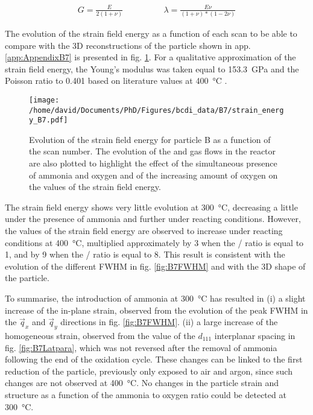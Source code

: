 \begin{align}
    G = \frac{E}{2(1+\nu)} \qquad & \qquad \lambda = \frac{E \nu}{(1+\nu)*(1-2\nu)}
    \label{eq:GandNu}
\end{align}

The evolution of the strain field energy as a function of each scan to be able to compare with the 3D reconstructions of the particle shown in app. \ref{app:AppendixB7} is presented in fig. \ref{fig:B7SFE}.
For a qualitative approximation of the strain field energy, the Young's modulus was taken equal to \qty{153.3}{\giga\pascal} and the Poisson ratio to \num{0.401} based on literature values at \qty{400}{\degreeCelsius} \parencite{Matthey2022}.

\begin{figure}[!htb]
    \centering
    \texttt{[image: /home/david/Documents/PhD/Figures/bcdi\_data/B7/strain\_energy\_B7.pdf]}
    \caption{
        Evolution of the strain field energy for particle B as a function of the scan number.
        The evolution of the  and  gas flows in the reactor are also plotted to highlight the effect of the simultaneous presence of ammonia and oxygen and of the increasing amount of oxygen on the values of the strain field energy.
    }
    \label{fig:B7SFE}
\end{figure}

The strain field energy shows very little evolution at \qty{300}{\degreeCelsius}, decreasing a little under the presence of ammonia and further under reacting conditions.
However, the values of the strain field energy are observed to increase under reacting conditions at \qty{400}{\degreeCelsius}, multiplied approximately by \num{3} when the / ratio is equal to 1, and by \num{9} when the / ratio is equal to 8.
This result is consistent with the evolution of the different FWHM in fig. \ref{fig:B7FWHM} and with the 3D shape of the particle.

To summarise, the introduction of ammonia at \qty{300}{\degreeCelsius} has resulted in (i) a slight increase of the in-plane strain, observed from the evolution of the peak FWHM in the $\vec{q}_x$ and $\vec{q}_y$ directions in fig. \ref{fig:B7FWHM}.
(ii) a large increase of the homogeneous strain, observed from the value of the $d_{111}$ interplanar spacing in fig. \ref{fig:B7Latpara}, which was not reversed after the removal of ammonia following the end of the oxidation cycle.
These changes can be linked to the first reduction of the particle, previously only exposed to air and argon, since such changes are not observed at \qty{400}{\degreeCelsius}.
No changes in the particle strain and structure as a function of the ammonia to oxygen ratio could be detected at \qty{300}{\degreeCelsius}.

